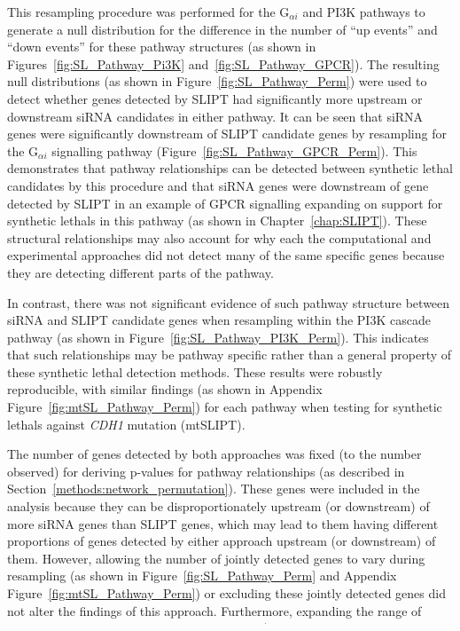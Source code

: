 This resampling procedure was performed for the G$_{\alpha i}$ and PI3K \glspl{pathway} to generate a null distribution for the difference in the number of ``up events'' and ``down events'' for these \gls{pathway} structures (as shown in Figures~\ref{fig:SL_Pathway_Pi3K} and~\ref{fig:SL_Pathway_GPCR}). The resulting null distributions (as shown in Figure~\ref{fig:SL_Pathway_Perm}) were used to detect whether genes detected by \gls{SLIPT} had significantly more upstream or downstream \gls{siRNA} candidates in either \gls{pathway}. It can be seen that \gls{siRNA} genes were significantly downstream of \gls{SLIPT} candidate genes by resampling for the G$_{\alpha i}$ signalling \gls{pathway} (Figure~\ref{fig:SL_Pathway_GPCR_Perm}). This demonstrates that \gls{pathway} relationships can be detected between \gls{synthetic lethal} candidates by this procedure and that \gls{siRNA} genes were downstream of gene detected by \gls{SLIPT} in an example of GPCR signalling expanding on support for \glspl{synthetic lethal} in this \gls{pathway} (as shown in Chapter~\ref{chap:SLIPT}). These structural relationships may also account for why each the computational and experimental approaches did not detect many of the same specific genes because they are detecting different parts of the \gls{pathway}.

In contrast, there was not significant evidence of such \gls{pathway} structure between \gls{siRNA} and \gls{SLIPT} candidate genes when resampling within the PI3K cascade \gls{pathway} (as shown in Figure~\ref{fig:SL_Pathway_PI3K_Perm}). This indicates that such relationships may be \gls{pathway} specific rather than a general property of these \gls{synthetic lethal} detection methods. These results were robustly reproducible, with similar findings (as shown in Appendix Figure~\ref{fig:mtSL_Pathway_Perm}) for each \gls{pathway} when testing for \glspl{synthetic lethal} against \textit{CDH1} \gls{mutation} (\acrshort{mtSLIPT}).

The number of genes detected by both approaches was fixed (to the number observed) for deriving p-values for pathway relationships (as described in Section~\ref{methods:network_permutation}). 
These genes were included in the analysis because they can be disproportionately upstream (or downstream) of more \gls{siRNA} genes than \gls{SLIPT} genes, which may lead to them having different proportions of genes detected by either approach upstream (or downstream) of them. 
However, allowing the number of  jointly detected genes to vary during resampling (as shown in Figure~\ref{fig:SL_Pathway_Perm} and Appendix Figure~\ref{fig:mtSL_Pathway_Perm}) or excluding these jointly detected genes did not alter the findings of this approach. Furthermore, expanding the range of \glspl{shortest path} to consider  in related \glspl{pathway} (using the ``meta-\glspl{pathway}'' constructed in Section~\ref{methods:subgraphs}) also had little effect on the null distribution generated, despite increasing the computational complexity of the procedure.

